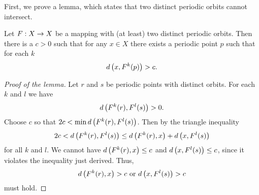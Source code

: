 \documentclass[10pt,draft,twoside]{book}
\begin{document}
First, we prove a lemma, which states that two distinct periodic orbits cannot intersect.
\begin{lemma}
  Let $F: X\rightarrow X$ be a mapping with (at least) two distinct periodic orbits.
  Then there is a $c > 0$ such that for any $x\in X$ there exists a periodic
  point $p$ such that for each $k$
  \begin{equation*}
    d\left( x, F^{k}(p) \right) > c.
  \end{equation*}
  \label{lem:dev1}
  \begin{proof}[Proof of the lemma]
    Let $r$ and $s$ be periodic points with distinct orbits. For each $k$ and $l$ we have
    \begin{equation*}
      d\left( F^{k}(r), F^{l}(s) \right) > 0.
    \end{equation*}
    Choose $c$ so that $2c < \min d\left( F^{k}(r),F^{l}(s) \right)$.
    Then by the triangle inequality
    \begin{equation*}
      2c < d\left( F^{k}(r),F^{l}(s) \right) \leq d\left( F^{k}(r),x \right) + d\left( x,F^{l}(s) \right)
    \end{equation*}
    for all $k$ and $l$.
    We cannot have $d\left( F^{k}(r),x \right) \leq c$ and $d\left( x,F^{l}(s) \right) \leq c$, since it violates the inequality just derived.
    Thus,
    \begin{equation*}
      d\left( F^{k}(r),x \right) > c \mbox{ or } d\left( x,F^{l}(s) \right) > c
    \end{equation*}
    must hold.
  \end{proof}
\end{lemma}
\end{document}
